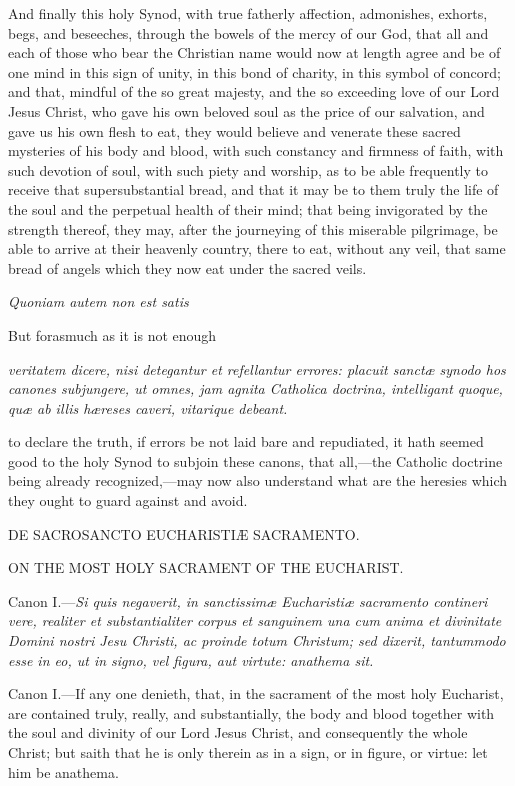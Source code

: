 And finally this holy Synod, with true fatherly affection, admonishes, exhorts, begs, and beseeches, through the bowels of the mercy of our God, that all and each of those who bear the Christian name would now at length agree and be of one mind in this sign of unity, in this bond of charity, in this symbol of concord; and that, mindful of the so great majesty, and the so exceeding love of our Lord Jesus Christ, who gave his own beloved soul as the price of our salvation, and gave us his own flesh to eat, they would believe and venerate these sacred mysteries of his body and blood, with such constancy and firmness of faith, with such devotion of soul, with such piety and worship, as to be able frequently to receive that supersubstantial bread, and that it may be to them truly the life of the soul and the perpetual health of their mind; that being invigorated by the strength thereof, they may, after the journeying of this miserable pilgrimage, be able to arrive at their heavenly country, there to eat, without any veil, that same bread of angels which they now eat under the sacred veils.

\emph{Quoniam autem non est satis }

But forasmuch as it is not enough

\emph{veritatem dicere, nisi detegantur et refellantur errores: placuit sanctæ synodo hos canones subjungere, ut omnes, jam agnita Catholica doctrina, intelligant quoque, quæ ab illis hæreses caveri, vitarique debeant.}

to declare the truth, if errors be not laid bare and repudiated, it hath seemed good to the holy Synod to subjoin these canons, that all,—the Catholic doctrine being already recognized,—may now also understand what are the heresies which they ought to guard against and avoid.

DE SACROSANCTO EUCHARISTIÆ SACRAMENTO.

ON THE MOST HOLY SACRAMENT OF THE EUCHARIST.

Canon I.—\emph{Si quis negaverit, in sanctissimæ Eucharistiæ sacramento contineri vere, realiter et substantialiter corpus et sanguinem una cum anima et divinitate Domini nostri Jesu Christi, ac proinde totum Christum; sed dixerit, tantummodo esse in eo, ut in signo, vel figura, aut virtute: anathema sit.}

Canon I.—If any one denieth, that, in the sacrament of the most holy Eucharist, are contained truly, really, and substantially, the body and blood together with the soul and divinity of our Lord Jesus Christ, and consequently the whole Christ; but saith that he is only therein as in a sign, or in figure, or virtue: let him be anathema.

